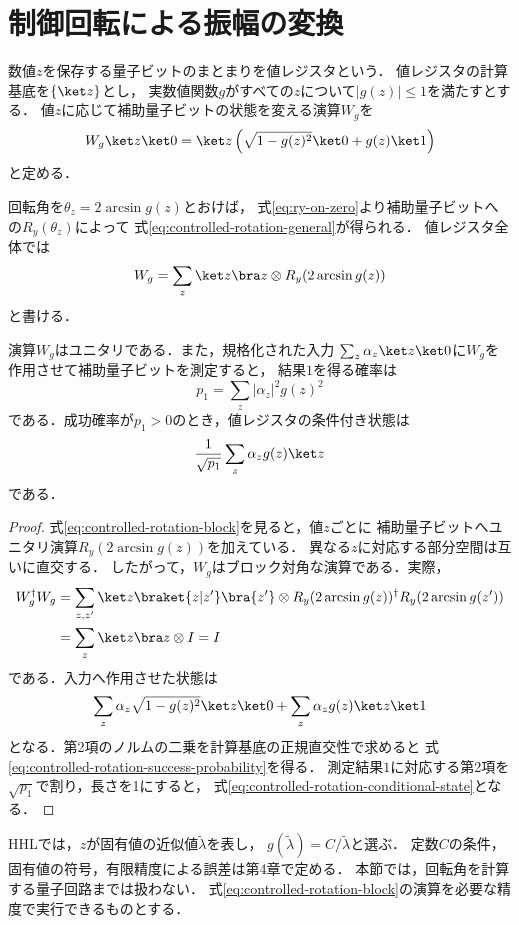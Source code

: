 \section{制御回転による振幅の変換}
\label{sec:controlled-rotation}

数値$z$を保存する量子ビットのまとまりを値レジスタという．
値レジスタの計算基底を$\{\ket z\}$とし，
実数値関数$g$がすべての$z$について$|g(z)|\leq1$を満たすとする．
値$z$に応じて補助量子ビットの状態を変える演算$W_g$を
\begin{equation}
 W_g\ket z\ket0
 =\ket z\left(
   \sqrt{1-g(z)^2}\ket0+g(z)\ket1
 \right)
 \label{eq:controlled-rotation-general}
\end{equation}
と定める．

回転角を$\theta_z=2\arcsin g(z)$とおけば，
式\eqref{eq:ry-on-zero}より補助量子ビットへの$R_y(\theta_z)$によって
式\eqref{eq:controlled-rotation-general}が得られる．
値レジスタ全体では
\begin{equation}
 W_g=\sum_z\ket z\bra z\otimes R_y(2\arcsin g(z))
 \label{eq:controlled-rotation-block}
\end{equation}
と書ける．

\begin{prop}
演算$W_g$はユニタリである．また，規格化された入力
$\sum_z\alpha_z\ket z\ket0$に$W_g$を作用させて補助量子ビットを測定すると，
結果$1$を得る確率は
\begin{equation}
 p_1=\sum_z|\alpha_z|^2g(z)^2
 \label{eq:controlled-rotation-success-probability}
\end{equation}
である．成功確率が$p_1>0$のとき，値レジスタの条件付き状態は
\begin{equation}
 \frac1{\sqrt{p_1}}\sum_z\alpha_zg(z)\ket z
 \label{eq:controlled-rotation-conditional-state}
\end{equation}
である．
\end{prop}
\begin{proof}
式\eqref{eq:controlled-rotation-block}を見ると，値$z$ごとに
補助量子ビットへユニタリ演算$R_y(2\arcsin g(z))$を加えている．
異なる$z$に対応する部分空間は互いに直交する．
したがって，$W_g$はブロック対角な演算である．実際，
\begin{align*}
 W_g^\dagger W_g
 &=\sum_{z,z'}\ket z\braket{z|z'}\bra{z'}
   \otimes R_y(2\arcsin g(z))^\dagger R_y(2\arcsin g(z'))\\
 &=\sum_z\ket z\bra z\otimes I=I
\end{align*}
である．入力へ作用させた状態は
\[
 \sum_z\alpha_z\sqrt{1-g(z)^2}\ket z\ket0
 +\sum_z\alpha_zg(z)\ket z\ket1
\]
となる．第2項のノルムの二乗を計算基底の正規直交性で求めると
式\eqref{eq:controlled-rotation-success-probability}を得る．
測定結果$1$に対応する第2項を$\sqrt{p_1}$で割り，長さを1にすると，
式\eqref{eq:controlled-rotation-conditional-state}となる．
\end{proof}

HHLでは，$z$が固有値の近似値$\widetilde\lambda$を表し，
$g(\widetilde\lambda)=C/\widetilde\lambda$と選ぶ．
定数$C$の条件，固有値の符号，有限精度による誤差は第4章で定める．
本節では，回転角を計算する量子回路までは扱わない．
式\eqref{eq:controlled-rotation-block}の演算を必要な精度で実行できるものとする．
